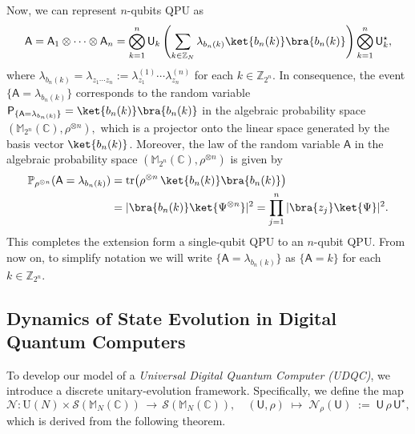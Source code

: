 \documentclass[a4paper,11pt]{article}
\DeclareMathOperator{\tr}{tr}
\newcommand{\rP}{\mathsf{P}}
\newcommand{\rU}{\mathsf{U}}
\newcommand{\rA}{\mathsf{A}}
\begin{document}
Now, we can represent $n$-qubits QPU as
\begin{align*}
  \rA = \rA_1 \otimes \cdots \otimes \rA_n = \bigotimes_{k=1}^n \rU_k \left(\sum_{k \in \mathbb{Z}_N} \lambda_{b_n(k)}  \ket{b_{n}(k)} \bra{b_n(k)} \right) \bigotimes_{k=1}^n \rU_k^{\star},
\end{align*}
where 
$\lambda_{b_n(k)} = \lambda_{z_1\cdots z_n}:=\lambda_{z_1}^{(1)} \cdots \lambda_{z_n}^{(n)}$ for each $k \in \mathbb{Z}_{2^n}.$ In consequence, the event \(\{\rA = \lambda_{b_n(k)}\}\) corresponds to the random variable \(\rP_{\{\rA = \lambda_{b_n(k)}\}} = \ket{b_n(k)}\bra{b_n(k)}\) in the algebraic probability space $(\mathbb{M}_{2^n}(\mathbb{C}),\rho^{\otimes n}),$ which is a projector onto the linear space generated by the basis vector \(\ket{b_n(k)}\). Moreover, the law of the random variable \(\rA\) in the algebraic probability space $(\mathbb{M}_{2^n}(\mathbb{C}),\rho^{\otimes n})$ is given by
\begin{align*}
\mathbb{P}_{\rho^{\otimes n}}(\rA = \lambda_{b_n(k)}) & = \tr\bigl(\rho^{\otimes n}\,\ket{b_n(k)}\bra{b_n(k)}\bigr)  \\ 
& = |\bra{b_n(k)}\ket{\Psi^{\otimes n}}|^2 = \prod_{j=1}^n |\bra{z_j}\ket{\Psi}|^2.
\end{align*}
This completes the extension form a single-qubit QPU to an $n$-qubit QPU. From now on, to simplify notation  we will write $\{\rA = \lambda_{b_n(k)}\}$ as $\{\rA = k \}$ for each $k \in \mathbb{Z}_{2^n}.$

\subsection{Dynamics of State Evolution in Digital Quantum Computers}\label{ch:dynamic}

To develop our model of a \emph{Universal Digital Quantum Computer (UDQC)}, we introduce a discrete unitary-evolution framework. Specifically, we define the map
\begin{equation}\label{eq:QPU}
\mathcal{N} : \mathrm{U}(N) \times \mathcal{S}(\mathbb{M}_N(\mathbb{C})) \,\to\, \mathcal{S}(\mathbb{M}_N(\mathbb{C})), 
\quad 
(\rU, \rho) \;\mapsto\; \mathcal{N}_\rho(\rU) \;:=\; \rU\,\rho\,\rU^{\star},
\end{equation}
which is derived from the following theorem.

\bigskip
\end{document}
